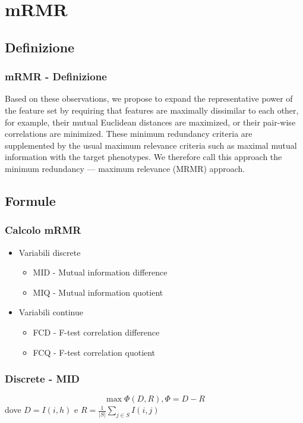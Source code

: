 \documentclass{beamer}
\begin{document}

\section{mRMR}
\subsection{Definizione}
\begin{frame}
	\frametitle{mRMR - Definizione}
	Based on these observations, we propose to expand the representative power of
	the feature set by requiring that features are maximally dissimilar to each other,
	for example, their mutual Euclidean distances are maximized, or their pair-wise
	correlations are minimized. These minimum redundancy criteria are supplemented
	by the usual maximum relevance criteria such as maximal mutual information with
	the target phenotypes. We therefore call this approach the minimum redundancy —
	maximum relevance (MRMR) approach.
\end{frame}

\subsection{Formule}
\begin{frame}
	\frametitle{Calcolo mRMR}
	\begin{itemize}
		\item Variabili discrete
			\begin{itemize}
				\item MID - Mutual information difference
				\item MIQ - Mutual information quotient\newline
			\end{itemize}
		\item Variabili continue
			\begin{itemize}
				\item FCD - F-test correlation difference
				\item FCQ - F-test correlation quotient
			\end{itemize}
	\end{itemize}
\end{frame}
\begin{frame}
	\frametitle{Discrete - MID}
	$$\max \Phi(D,R), \Phi = D - R$$
	dove $D=I(i,h)$ e $R=\frac{1}{|S|}\sum\limits_{j \in S}I(i,j)$
\end{frame}
\end{document}
